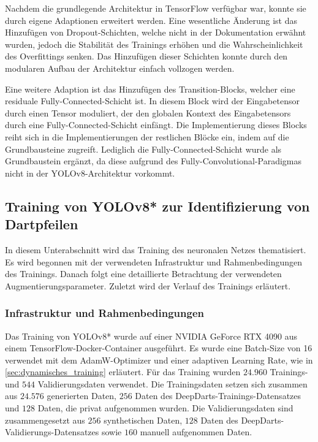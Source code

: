 Nachdem die grundlegende Architektur in TensorFlow verfügbar war, konnte sie durch eigene Adaptionen erweitert werden. Eine wesentliche Änderung ist das Hinzufügen von Dropout-Schichten, welche nicht in der Dokumentation erwähnt wurden, jedoch die Stabilität des Trainings erhöhen und die Wahrscheinlichkeit des Overfittings senken. Das Hinzufügen dieser Schichten konnte durch den modularen Aufbau der Architektur einfach vollzogen werden.

Eine weitere Adaption ist das Hinzufügen des Transition-Blocks, welcher eine residuale Fully-Connected-Schicht ist. In diesem Block wird der Eingabetensor durch einen Tensor moduliert, der den globalen Kontext des Eingabetensors durch eine Fully-Connected-Schicht einfängt. Die Implementierung dieses Blocks reiht sich in die Implementierungen der restlichen Blöcke ein, indem auf die Grundbausteine zugreift. Lediglich die Fully-Connected-Schicht wurde als Grundbaustein ergänzt, da diese aufgrund des Fully-Convolutional-Paradigmas nicht in der YOLOv8-Architektur vorkommt.


\subsection{Training von YOLOv8* zur Identifizierung von Dartpfeilen}
\label{sec:training}

In diesem Unterabschnitt wird das Training des neuronalen Netzes thematisiert. Es wird begonnen mit der verwendeten Infrastruktur und Rahmenbedingungen des Trainings. Danach folgt eine detaillierte Betrachtung der verwendeten Augmentierungsparameter. Zuletzt wird der Verlauf des Trainings erläutert.

\subsubsection{Infrastruktur und Rahmenbedingungen}

Das Training von YOLOv8* wurde auf einer NVIDIA GeForce RTX 4090 aus einem TensorFlow-Docker-Container ausgeführt. Es wurde eine Batch-Size von 16 verwendet mit dem AdamW-Optimizer und einer adaptiven Learning Rate, wie in \autoref{sec:dynamisches_training} erläutert. Für das Training wurden $24.960$ Trainings- und $544$ Validierungsdaten verwendet. Die Trainingsdaten setzen sich zusammen aus $24.576$ generierten Daten, $256$ Daten des DeepDarts-Trainings-Datensatzes und $128$ Daten, die privat aufgenommen wurden. Die Validierungsdaten sind zusammengesetzt aus $256$ synthetischen Daten, $128$ Daten des DeepDarts-Validierungs-Datensatzes sowie $160$ manuell aufgenommen Daten.

